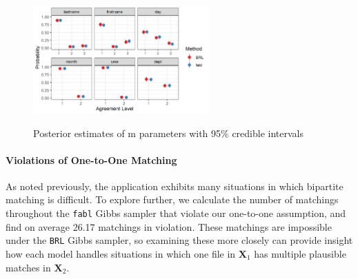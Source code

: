 \documentclass[12pt,letterpaper]{article}
\newcommand{\1}[1]{\mathbb{I}\!\left[#1\right]} %
\begin{document}
\begin{figure}[h!]
\begin{center}
\includegraphics[width=0.6\textwidth]{../notes/figures/el_salvador/m_posterior_smallP} 
\caption{Posterior estimates of m parameters with 95\% credible intervals}\label{fig:m-and-u}
\label{fig:m-and-u}
\end{center}
\end{figure}



\paragraph{Violations of One-to-One Matching} 

{
\color{blue}
As noted previously, the application exhibits many situations in which bipartite matching is difficult. To explore further, we calculate the number of matchings throughout the \texttt{fabl} Gibbs sampler that violate our one-to-one assumption, and find on average 26.17 matchings in violation. These matchings are impossible under the \texttt{BRL} Gibbs sampler, so examining these more closely can provide insight how each model handles situations in which one file in \(\bm{X}_1\) has
multiple plausible matches in \(\bm{X}_2\). 
}

\end{document}
